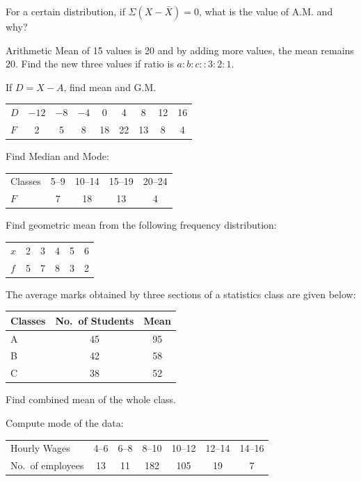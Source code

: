 \documentclass[11pt,a4paper]{article}
\begin{document}
\begin{longlist}
\item For a certain distribution, if $\Sigma(X-\bar{X})=0$, what is the value of A.M. and why?

\item Arithmetic Mean of 15 values is 20 and by adding more values, the mean remains 20. Find the new three values if ratio is $a:b:c :: 3:2:1$.

\item If $D=X-A$, find mean and G.M.
\begin{center}
\begin{tabular}{l|cccccccc}
$D$ & $-12$ & $-8$ & $-4$ & 0 & 4 & 8 & 12 & 16 \\
$F$ & 2 & 5 & 8 & 18 & 22 & 13 & 8 & 4
\end{tabular}
\end{center}

\item Find Median and Mode:
\begin{center}
\begin{tabular}{l|cccc}
Classes & 5--9 & 10--14 & 15--19 & 20--24 \\
$F$ & 7 & 18 & 13 & 4
\end{tabular}
\end{center}

\item Find geometric mean from the following frequency distribution:
\begin{center}
\begin{tabular}{l|ccccc}
$x$ & 2 & 3 & 4 & 5 & 6 \\
$f$ & 5 & 7 & 8 & 3 & 2
\end{tabular}
\end{center}

\item The average marks obtained by three sections of a statistics class are given below:
\begin{center}
\begin{tabular}{lcc}
Classes & No.\ of Students & Mean \\
\hline
A & 45 & 95 \\
B & 42 & 58 \\
C & 38 & 52
\end{tabular}
\end{center}
Find combined mean of the whole class.

\item Compute mode of the data:
\begin{center}
\begin{tabular}{l|cccccc}
Hourly Wages & 4--6 & 6--8 & 8--10 & 10--12 & 12--14 & 14--16 \\
No.\ of employees & 13 & 11 & 182 & 105 & 19 & 7
\end{tabular}
\end{center}


\end{longlist}
\end{document}
